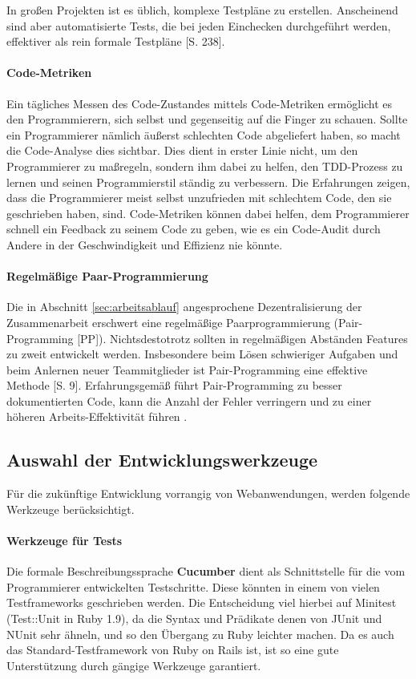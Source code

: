 In großen Projekten ist es üblich, komplexe Testpläne zu erstellen. Anscheinend sind aber automatisierte Tests, die bei jeden Einchecken durchgeführt werden, effektiver als rein formale Testpläne \citep{hunt_pragmatic_1999}[S. 238].

\paragraph{Code-Metriken} Ein tägliches Messen des Code-Zustandes mittels Code-Metriken ermöglicht es den Programmierern, sich selbst und gegenseitig auf die Finger zu schauen. Sollte ein Programmierer nämlich äußerst schlechten Code abgeliefert haben, so macht die Code-Analyse dies sichtbar. Dies dient in erster Linie nicht, um den Programmierer zu maßregeln, sondern ihm dabei zu helfen, den TDD-Prozess zu lernen und seinen Programmierstil ständig zu verbessern. Die Erfahrungen zeigen, dass die Programmierer meist selbst unzufrieden mit schlechtem Code, den sie geschrieben haben, sind. Code-Metriken können dabei helfen, dem Programmierer schnell ein Feedback zu seinem Code zu geben, wie es ein Code-Audit durch Andere in der Geschwindigkeit und Effizienz nie könnte.

\paragraph{Regelmäßige Paar-Programmierung} Die in Abschnitt \ref{sec:arbeitsablauf} angesprochene Dezentralisierung der Zusammenarbeit erschwert eine regelmäßige Paarprogrammierung (Pair-Programming [PP]). Nichtsdestotrotz sollten in regelmäßigen Abständen Features zu zweit entwickelt werden.  Insbesondere beim Lösen schwieriger Aufgaben und beim Anlernen neuer Teammitglieder ist Pair-Programming eine effektive Methode \citep{hulkko_multiple_2005}[S. 9]. Erfahrungsgemäß führt Pair-Programming zu besser dokumentierten Code, kann die Anzahl der Fehler verringern und zu einer höheren Arbeits-Effektivität führen \citep{hulkko_multiple_2005}.


\subsection{Auswahl der Entwicklungswerkzeuge}
\label{sec:devtools}

Für die zukünftige Entwicklung vorrangig von Webanwendungen, werden folgende Werkzeuge berücksichtigt.

\paragraph{Werkzeuge für Tests} Die formale Beschreibungssprache \textbf{Cucumber} dient als Schnittstelle für die vom Programmierer entwickelten Testschritte. Diese könnten in einem von vielen Testframeworks geschrieben werden. Die Entscheidung viel hierbei auf Minitest (Test::Unit in Ruby 1.9), da die Syntax und Prädikate denen von JUnit und NUnit sehr ähneln, und so den Übergang zu Ruby leichter machen. Da es auch das Standard-Testframework von Ruby on Rails ist, ist so eine gute Unterstützung durch gängige Werkzeuge garantiert.

